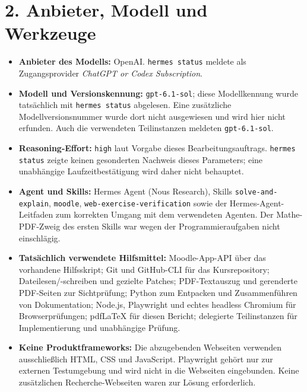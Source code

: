 \documentclass[11pt,a4paper]{article}
\begin{document}
\section*{2. Anbieter, Modell und Werkzeuge}
\begin{itemize}
\item \textbf{Anbieter des Modells:} OpenAI. \texttt{hermes status} meldete als Zugangsprovider \emph{ChatGPT or Codex Subscription}.
\item \textbf{Modell und Versionskennung:} \texttt{gpt-6.1-sol}; diese Modellkennung wurde tatsächlich mit \texttt{hermes status} abgelesen. Eine zusätzliche Modellversionsnummer wurde dort nicht ausgewiesen und wird hier nicht erfunden. Auch die verwendeten Teilinstanzen meldeten \texttt{gpt-6.1-sol}.
\item \textbf{Reasoning-Effort:} \texttt{high} laut Vorgabe dieses Bearbeitungsauftrags. \texttt{hermes status} zeigte keinen gesonderten Nachweis dieses Parameters; eine unabhängige Laufzeitbestätigung wird daher nicht behauptet.
\item \textbf{Agent und Skills:} Hermes Agent (Nous Research), Skills \texttt{solve-and-explain}, \texttt{moodle}, \texttt{web-exercise-verification} sowie der Hermes-Agent-Leitfaden zum korrekten Umgang mit dem verwendeten Agenten. Der Mathe-PDF-Zweig des ersten Skills war wegen der Programmieraufgaben nicht einschlägig.
\item \textbf{Tatsächlich verwendete Hilfsmittel:} Moodle-App-API über das vorhandene Hilfsskript; Git und GitHub-CLI für das Kursrepository; Dateilesen/-schreiben und gezielte Patches; PDF-Textauszug und gerenderte PDF-Seiten zur Sichtprüfung; Python zum Entpacken und Zusammenführen von Dokumentation; Node.js, Playwright und echtes headless Chromium für Browserprüfungen; pdfLaTeX für diesen Bericht; delegierte Teilinstanzen für Implementierung und unabhängige Prüfung.
\item \textbf{Keine Produktframeworks:} Die abzugebenden Webseiten verwenden ausschließlich HTML, CSS und JavaScript. Playwright gehört nur zur externen Testumgebung und wird nicht in die Webseiten eingebunden. Keine zusätzlichen Recherche-Webseiten waren zur Lösung erforderlich.
\end{itemize}
\end{document}
